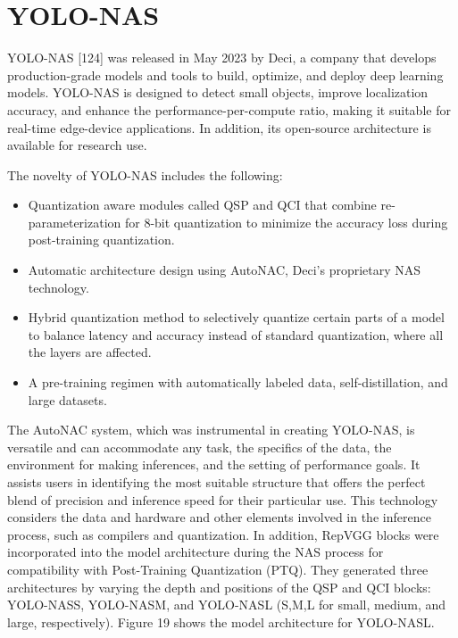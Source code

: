 \documentclass{article}
\begin{document}
\section{YOLO-NAS}



YOLO-NAS [124] was released in May 2023 by Deci, a company that develops production-grade models and tools to build, optimize, and deploy deep learning models. YOLO-NAS is designed to detect small objects, improve localization accuracy, and enhance the performance-per-compute ratio, making it suitable for real-time edge-device applications. In addition, its open-source architecture is available for research use.

The novelty of YOLO-NAS includes the following:

\begin{itemize}
    \item Quantization aware modules \cite{chu2024make} called QSP and QCI that combine re-parameterization for 8-bit quantization to minimize the accuracy loss during post-training quantization.
    \item Automatic architecture design using AutoNAC, Deci’s proprietary NAS technology.
    \item Hybrid quantization method to selectively quantize certain parts of a model to balance latency and accuracy instead of standard quantization, where all the layers are affected.
    \item A pre-training regimen with automatically labeled data, self-distillation, and large datasets.
\end{itemize}


The AutoNAC system, which was instrumental in creating YOLO-NAS, is versatile and can accommodate any task, the specifics of the data, the environment for making inferences, and the setting of performance goals. It assists users in identifying the most suitable structure that offers the perfect blend of precision and inference speed for their particular use. This technology considers the data and hardware and other elements involved in the inference process, such as compilers and quantization. In addition, RepVGG blocks were incorporated into the model architecture during the NAS process for compatibility with Post-Training Quantization (PTQ). They generated three architectures by varying the depth and positions of the QSP and QCI blocks: YOLO-NASS, YOLO-NASM, and YOLO-NASL (S,M,L for small, medium, and large, respectively). Figure 19 shows the model architecture for YOLO-NASL.
\end{document}
